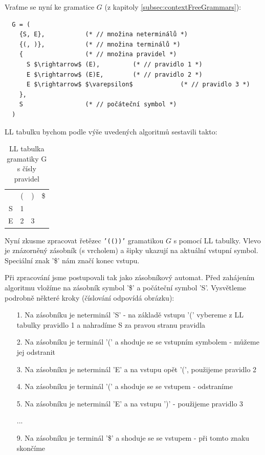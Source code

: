 \begin{exmp}
Vraťme se nyní ke gramatice $G$
(z kapitoly \ref{subsec:contextFreeGrammars}):

\begin{lstlisting}
  G = (
    {S, E},           (* // množina neterminálů *)
    {(, )},           (* // množina terminálů *)
    {                 (* // množina pravidel *)
      S $\rightarrow$ (E),         (* // pravidlo 1 *)
      E $\rightarrow$ (E)E,        (* // pravidlo 2 *)
      E $\rightarrow$ $\varepsilon$             (* // pravidlo 3 *)
    },
    S                 (* // počáteční symbol *)
  )
\end{lstlisting}
\noindent
LL tabulku bychom podle výše uvedených algoritmů sestavili takto:
\begin{table}[H]
  \centering
  \begin{tabular}{| c || c | c | c |}
    \hline
      & ( & ) & \$ \\
    \hhline{|=||=|=|=|}
    S & 1 &   &    \\
    \hline
    E & 2 & 3 &    \\
    \hline
  \end{tabular}
  \caption{LL tabulka gramatiky G s čísly pravidel}
\end{table}


Nyní zkusme zpracovat řetězec \texttt{'(())'} gramatikou $G$
s pomocí LL tabulky.
Vlevo je znázorněný zásobník (s vrcholem)
a šipky ukazují na aktuální vstupní symbol.
Speciální znak '\$' nám značí konec vstupu.

\begin{figure}[H]
  \centering
\end{figure}

Při zpracování jsme postupovali tak jako zásobníkový automat.
Před zahájením algoritmu vložíme na zásobník symbol '\$'
a počáteční symbol 'S'. Vysvětleme podrobně některé kroky (číslování odpovídá obrázku):

\begin{itemize}
  \item[1.] Na zásobníku je neterminál 'S' - na základě vstupu '(' vybereme
  z LL tabulky pravidlo 1 a nahradíme S za pravou stranu pravidla
  \item[2.] Na zásobníku je terminál '(' a shoduje se se vstupním symbolem - můžeme jej odstranit
  \item[3.] Na zásobníku je neterminál 'E' a na vstupu opět '(', použijeme pravidlo 2
  \item[4.] Na zásobníku je terminál '(' a shoduje se se vstupem - odstraníme
  \item[5.] Na zásobníku je neterminál 'E' a na vstupu ')' - použijeme pravidlo 3
  \item[] ...
  \item[9.] Na zásobníku je terminál '\$' a shoduje se se vstupem - při tomto znaku skončíme
\end{itemize}
\end{exmp}

